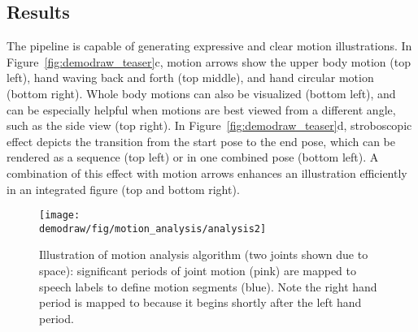 \subsection{Results}
The \systemname{} pipeline is capable of generating expressive and clear motion illustrations. In Figure~\ref{fig:demodraw_teaser}c, motion arrows show the upper body motion (top left), hand waving back and forth (top middle), and hand circular motion (bottom right). Whole body motions can also be visualized (bottom left), and can be especially helpful when motions are best viewed from a different angle, such as the side view (top right).
%
In Figure~\ref{fig:demodraw_teaser}d, stroboscopic effect depicts the transition from the start pose to the end pose, which can be rendered as a sequence (top left) or in one combined pose (bottom left). A combination of this effect with motion arrows enhances an illustration efficiently in an integrated figure (top and bottom right).




\begin{figure}[t]
  \centering
  \texttt{[image: \\demodraw/fig/motion\_analysis/analysis2]}
  \caption{Illustration of motion analysis algorithm (two joints shown due to space): significant periods of joint motion (pink) are mapped to speech labels to define motion segments (blue). Note the right hand period is mapped to  because it begins shortly after the left hand period.}
   \label{fig:segmentation}
\end{figure}





